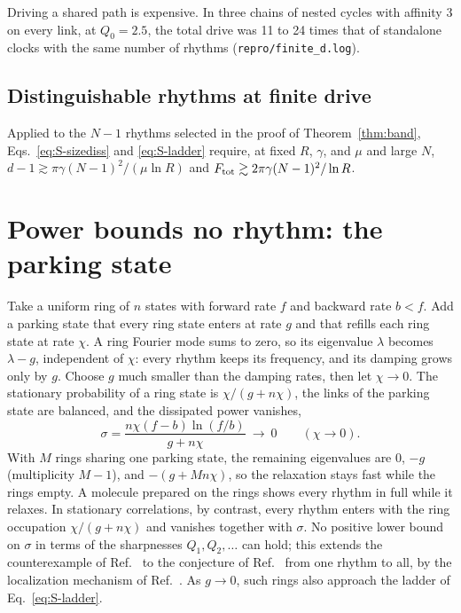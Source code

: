 Driving a shared path is expensive. In three chains of nested cycles with affinity 3 on every link, at $Q_0=2.5$, the total drive was 11 to 24 times that of standalone clocks with the same number of rhythms (\texttt{repro/finite\_d.log}).

\subsection{Distinguishable rhythms at finite drive}

Applied to the $N-1$ rhythms selected in the proof of Theorem~\ref{thm:band}, Eqs.~\eqref{eq:S-sizediss} and \eqref{eq:S-ladder} require, at fixed $R$, $\gamma$, and $\mu$ and large $N$, $d-1\gtrsim\pi\gamma(N-1)^2/(\mu\ln R)$ and $F_{\mathrm{tot}}\gtrsim2\pi\gamma(N-1)^2/\ln R$.

\section{Power bounds no rhythm: the parking state}\label{sec:rate}

Take a uniform ring of $n$ states with forward rate $f$ and backward rate $b<f$. Add a parking state that every ring state enters at rate $g$ and that refills each ring state at rate $\chi$. A ring Fourier mode sums to zero, so its eigenvalue $\lambda$ becomes $\lambda-g$, independent of $\chi$: every rhythm keeps its frequency, and its damping grows only by $g$. Choose $g$ much smaller than the damping rates, then let $\chi\to0$. The stationary probability of a ring state is $\chi/(g+n\chi)$, the links of the parking state are balanced, and the dissipated power vanishes,
\begin{equation}
\sigma=\frac{n\chi(f-b)\ln(f/b)}{g+n\chi}\ \longrightarrow\ 0\qquad(\chi\to0).
\end{equation}
With $M$ rings sharing one parking state, the remaining eigenvalues are $0$, $-g$ (multiplicity $M-1$), and $-(g+Mn\chi)$, so the relaxation stays fast while the rings empty. A molecule prepared on the rings shows every rhythm in full while it relaxes. In stationary correlations, by contrast, every rhythm enters with the ring occupation $\chi/(g+n\chi)$ and vanishes together with $\sigma$. No positive lower bound on $\sigma$ in terms of the sharpnesses $Q_1,Q_2,\dots$ can hold; this extends the counterexample of Ref.~\cite{shiraishi2026} to the conjecture of Ref.~\cite{oberreiter2022} from one rhythm to all, by the localization mechanism of Ref.~\cite{gu2026}. As $g\to0$, such rings also approach the ladder of Eq.~\eqref{eq:S-ladder}.

